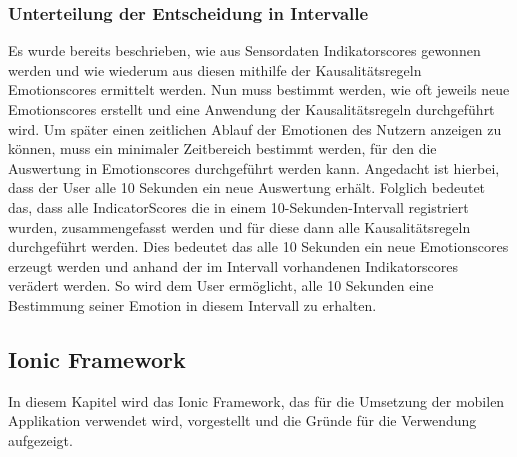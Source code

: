 \subsubsection{Unterteilung der Entscheidung in Intervalle}
Es wurde bereits beschrieben, wie aus Sensordaten Indikatorscores gewonnen werden und wie wiederum aus diesen mithilfe der Kausalitätsregeln Emotionscores ermittelt werden. Nun muss bestimmt werden, wie oft jeweils neue Emotionscores erstellt und eine Anwendung der Kausalitätsregeln durchgeführt wird. \newline
Um später einen zeitlichen Ablauf der Emotionen des Nutzern anzeigen zu können, muss ein minimaler Zeitbereich bestimmt werden, für den die Auswertung in Emotionscores durchgeführt werden kann. Angedacht ist hierbei, dass der User alle 10 Sekunden ein neue Auswertung erhält. Folglich bedeutet das, dass alle IndicatorScores die in einem 10-Sekunden-Intervall registriert wurden, zusammengefasst werden und für diese dann alle Kausalitätsregeln durchgeführt werden. Dies bedeutet das alle 10 Sekunden ein neue Emotionscores erzeugt werden und anhand der im Intervall vorhandenen Indikatorscores verädert werden. So wird dem User ermöglicht, alle 10 Sekunden eine Bestimmung seiner Emotion in diesem Intervall zu erhalten.
\subsection{Ionic Framework}
In diesem Kapitel wird das Ionic Framework, das für die Umsetzung der mobilen Applikation verwendet wird, vorgestellt und die Gründe für die Verwendung aufgezeigt.
